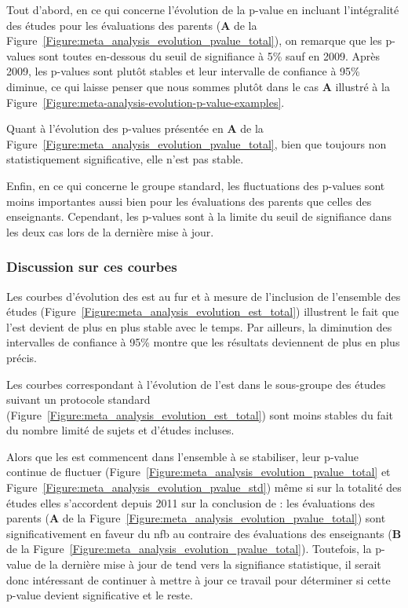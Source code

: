 \begin{itemize}
Tout d'abord, en ce qui concerne l'évolution de la p-value en incluant l'intégralité des études pour les 
évaluations des parents (\textbf{A} de la Figure~\ref{Figure:meta_analysis_evolution_pvalue_total}), on remarque que les p-values sont toutes
en-dessous du seuil de signifiance à 5\% sauf en 2009. Après 2009, les p-values sont plutôt stables et leur intervalle de confiance à 95\% diminue, ce qui laisse 
penser que nous sommes plutôt dans le cas \textbf{A} illustré à la Figure~\ref{Figure:meta-analysis-evolution-p-value-examples}.

Quant à l'évolution des p-values présentée en \textbf{A} de la Figure~\ref{Figure:meta_analysis_evolution_pvalue_total}, bien que toujours non statistiquement significative, 
elle n'est pas stable.

Enfin, en ce qui concerne le groupe standard, les fluctuations des p-values sont moins importantes aussi bien pour les évaluations des parents que celles des enseignants. 
Cependant, les p-values sont à la limite du seuil de signifiance dans les deux cas lors de la dernière mise à jour.

\subsubsection{Discussion sur ces courbes}

Les courbes d'évolution des \gls{est} au fur et à mesure de l'inclusion de l'ensemble des études (Figure~\ref{Figure:meta_analysis_evolution_est_total}) illustrent le fait que l'\gls{est} 
devient de plus en plus stable avec le temps. Par ailleurs, la diminution des intervalles de confiance à 95\% montre que les résultats deviennent de plus en plus précis.

Les courbes correspondant à l'évolution de l'\gls{est} dans le sous-groupe des études suivant un protocole standard (Figure~\ref{Figure:meta_analysis_evolution_est_total}) sont moins stables 
du fait du nombre limité de sujets et d'études incluses.

Alors que les \gls{est} commencent dans l'ensemble à se stabiliser, leur p-value continue de fluctuer (Figure~\ref{Figure:meta_analysis_evolution_pvalue_total} et 
Figure~\ref{Figure:meta_analysis_evolution_pvalue_std}) même si sur la totalité des études elles s'accordent depuis 2011 sur la conclusion de \citet{Cortese2016} :
les évaluations des parents (\textbf{A} de la Figure~\ref{Figure:meta_analysis_evolution_pvalue_total}) sont significativement en faveur du \gls{nfb} 
au contraire des évaluations des enseignants (\textbf{B} de la Figure~\ref{Figure:meta_analysis_evolution_pvalue_total}). 
Toutefois, la p-value de la dernière mise à jour de \citet{Cortese2016} tend vers la signifiance statistique, il serait donc intéressant de continuer à mettre à jour ce travail pour déterminer si 
cette p-value devient significative et le reste.


\end{itemize}
